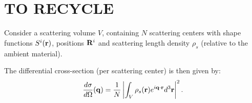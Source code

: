 \section{TO RECYCLE}

Consider a scattering volume $V$, containing $N$ scattering centers with shape functions $S^i(\mathbf{r})$, positions $\mathbf{R}^i$ and scattering length density $\rho_s$ (relative to the ambient material).

The differential cross-section (per scattering center) is then given by:
\begin{equation}\label{Exsec1}
  \frac{d\sigma}{d\Omega}(\mathbf{q}) = \frac{1}{N}\left\lvert \int_V \rho_s(\mathbf{r}) e^{i\mathbf{q}\cdot\mathbf{r}} d^3\mathbf{r} \right\rvert ^2.
\end{equation}

